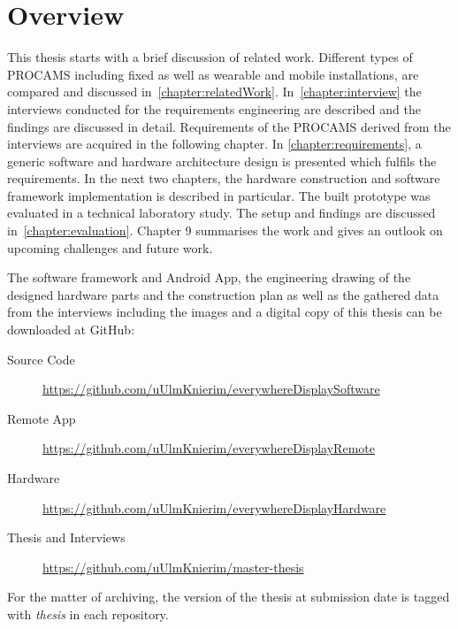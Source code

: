 \section{Overview}
This thesis starts with a brief discussion of related work. Different types of PROCAMS including fixed as well as wearable and mobile installations, are compared and discussed in~\autoref{chapter:relatedWork}. In~\autoref{chapter:interview} the interviews conducted for the requirements engineering are described and the findings are discussed in detail. Requirements of the PROCAMS derived from the interviews are acquired in the following chapter. In \autoref{chapter:requirements}, a generic software and hardware architecture design is presented which fulfils the requirements. In the next two chapters, the hardware construction and software framework implementation is described in particular. The built prototype was evaluated in a technical laboratory study. The setup and findings are discussed in~\autoref{chapter:evaluation}. Chapter 9 summarises the work and gives an outlook on upcoming challenges and future work.

The software framework and Android App, the engineering drawing of the designed hardware parts and the construction plan as well as the gathered data from the interviews including the images and a digital copy of this thesis can be downloaded at GitHub:
\begin{description}
  \item[Source Code] \url{https://github.com/uUlmKnierim/everywhereDisplaySoftware}
  \item[Remote App] \url{https://github.com/uUlmKnierim/everywhereDisplayRemote}
  \item[Hardware] \url{https://github.com/uUlmKnierim/everywhereDisplayHardware}
  \item[Thesis and Interviews] \url{https://github.com/uUlmKnierim/master-thesis}
\end{description} 
For the matter of archiving, the version of the thesis at submission date is tagged with \emph{thesis} in each repository.